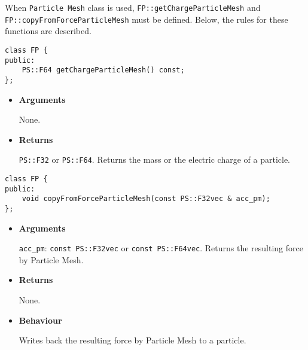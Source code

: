 
When \texttt{Particle Mesh} class is used, \texttt{FP::getChargeParticleMesh} and \texttt{FP::copyFromForceParticleMesh} must be defined. Below, the rules for these functions are described.


\begin{screen}
\begin{verbatim}
class FP {
public:
    PS::F64 getChargeParticleMesh() const;
};
\end{verbatim}
\end{screen}

\begin{itemize}

\item {\bf Arguments}

  None.

\item {\bf Returns}

  \texttt{PS::F32} or \texttt{PS::F64}.
  Returns the mass or the electric charge of a particle.

\end{itemize}


\begin{screen}
\begin{verbatim}
class FP {
public:
    void copyFromForceParticleMesh(const PS::F32vec & acc_pm);
};
\end{verbatim}
\end{screen}

\begin{itemize}

\item {\bf Arguments}

  \texttt{acc\_pm}: \texttt{const PS::F32vec} or \texttt{const PS::F64vec}. Returns the resulting force by Particle Mesh.

\item {\bf Returns}

  None.
  
\item {\bf Behaviour}

  Writes back the resulting force by Particle Mesh to a particle.
  
\end{itemize}

